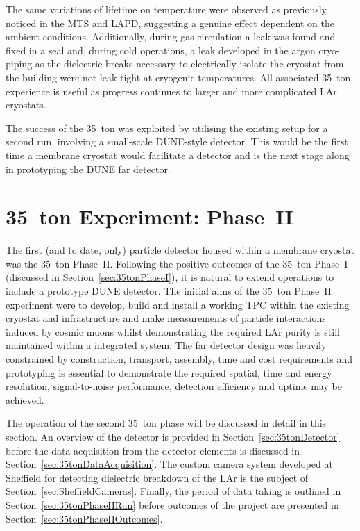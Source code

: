 The same variations of lifetime on temperature were observed as previously noticed in the MTS and LAPD, suggesting a genuine effect dependent on the ambient conditions.  Additionally, during gas circulation a leak was found and fixed in a seal and, during cold operations, a leak developed in the argon cryo-piping as the dielectric breaks necessary to electrically isolate the cryostat from the building were not leak tight at cryogenic temperatures.  All associated 35~ton experience is useful as progress continues to larger and more complicated LAr cryostats.

The success of the 35~ton was exploited by utilising the existing setup for a second run, involving a small-scale DUNE-style detector.  This would be the first time a membrane cryostat would facilitate a detector and is the next stage along in prototyping the DUNE far detector.

\section{35~ton Experiment: Phase~II}\label{sec:35tonPhaseII}

The first (and to date, only) particle detector housed within a membrane cryostat was the 35~ton Phase~II.  Following the positive outcomes of the 35~ton Phase~I (discussed in Section~\ref{sec:35tonPhaseI}), it is natural to extend operations to include a prototype DUNE detector.  The initial aims of the 35~ton Phase~II experiment were to develop, build and install a working TPC within the existing cryostat and infrastructure and make measurements of particle interactions induced by cosmic muons whilst demonstrating the required LAr purity is still maintained within a integrated system.  The far detector design was heavily constrained by construction, transport, assembly, time and cost requirements and prototyping is essential to demonstrate the required spatial, time and energy resolution, signal-to-noise performance, detection efficiency and uptime may be achieved.

The operation of the second 35~ton phase will be discussed in detail in this section.  An overview of the detector is provided in Section~\ref{sec:35tonDetector} before the data acquisition from the detector elements is discussed in Section~\ref{sec:35tonDataAcquisition}.  The custom camera system developed at Sheffield for detecting dielectric breakdown of the LAr is the subject of Section~\ref{sec:SheffieldCameras}.  Finally, the period of data taking is outlined in Section~\ref{sec:35tonPhaseIIRun} before outcomes of the project are presented in Section~\ref{sec:35tonPhaseIIOutcomes}.


